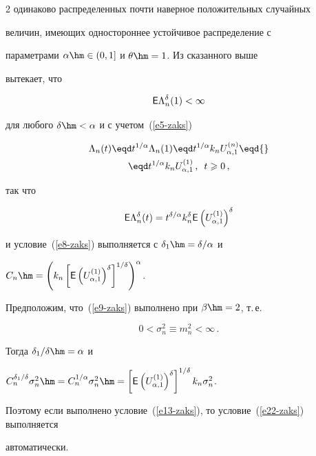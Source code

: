 \begin{multicols}{2}
одинаково распределенных почти наверное положительных случайных

величин, имеющих одностороннее устойчивое распределение с

параметрами $\alpha\hm\in(0,1]$ и $\theta\hm=1$. Из сказанного выше

вытекает, что

$$

{\sf E}\Lambda^{\delta}_n(1)<\infty

$$

для любого $\delta\hm<\alpha$ и с учетом~(\ref{e5-zaks})

\begin{multline}

\Lambda_n(t)\eqd t^{1/\alpha}\Lambda_n(1)\eqd

t^{1/\alpha}k_nU^{(n)}_{\alpha,1}\eqd{}\\

{}\eqd

t^{1/\alpha}k_nU^{(1)}_{\alpha,1}\,, \enskip t\geqslant0\,,\label{e28-zaks}

\end{multline}

так что

$$

{\sf E}\Lambda_n^{\delta}(t)=t^{\delta/\alpha}k_n^{\delta}{\sf

E}\left(U^{(1)}_{\alpha,1}\right)^{\delta}

$$

и условие~(\ref{e8-zaks}) выполняется с $\delta_1\hm=\delta/\alpha$ и

$C_n\hm=\left(k_n\left[{\sf E}\left(U_{\alpha,1}^{(1)}\right)^{\delta}\right]^{1/\delta}

\right)^{\alpha}$.

Предположим, что~(\ref{e9-zaks}) выполнено при $\beta\hm=2$, т.\,е.\

$$

0<\sigma_n^2\equiv m_n^2<\infty\,.

$$

Тогда $\delta_1/\delta\hm=\alpha$ и

$C_n^{\delta_1/\delta}\sigma_n^2\hm=C_n^{1/\alpha}\sigma_n^2\hm=\left[{\sf

E}\left(U_{\alpha,1}^{(1)}\right)^{\delta}\right]^{1/\delta}k_n\sigma_n^2$.

Поэтому если выполнено условие~(\ref{e13-zaks}), то условие~(\ref{e22-zaks}) выполняется

автоматически.




\end{multicols}
